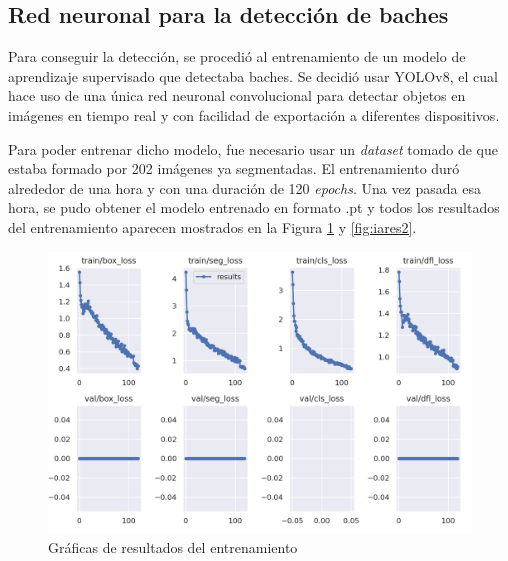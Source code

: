 \subsection{Red neuronal para la detección de baches}
\label{subsec:softwareiayolo}

Para conseguir la detección, se procedió al entrenamiento de un modelo de aprendizaje supervisado que detectaba baches. Se decidió usar YOLOv8, el cual hace uso de una única red neuronal convolucional para detectar objetos en imágenes en tiempo real y con facilidad de exportación a diferentes dispositivos.

Para poder entrenar dicho modelo, fue necesario usar un \textit{dataset} tomado de \cite{pothole-detection-project-new_dataset} que estaba formado por 202 imágenes ya segmentadas. El entrenamiento duró alrededor de una hora y con una duración de 120 \textit{epochs}. Una vez pasada esa hora, se pudo obtener el modelo entrenado en formato .pt y todos los resultados del entrenamiento aparecen mostrados en la Figura \ref{fig:iares} y \ref{fig:iares2}.

 \begin{figure} [h!]
	\begin{center}
		\includegraphics[width=15cm]{figs/cap6/results.png}
	\end{center}
	\caption{Gráficas de resultados del entrenamiento}
	\label{fig:iares}
\end{figure}


